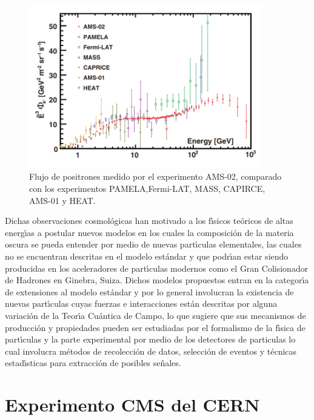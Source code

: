 \begin{figure}
\begin{center}
 \includegraphics[width=4.0in]{AMS_positronflux.png}
  \caption{Flujo de positrones medido por el experimento AMS-02, comparado con los experimentos PAMELA,Fermi-LAT, MASS, CAPIRCE, AMS-01 y HEAT.}
 \label{fig:AMS_positron}
 \end{center}
\end{figure}

Dichas observaciones cosmol\'ogicas han motivado a los f\'{\i}sicos te\'oricos de altas energ\'{\i}as a postular nuevos modelos en los cuales la composici\'on de la materia oscura se pueda entender por medio de nuevas part\'{\i}culas elementales, las cuales no se encuentran descritas en el modelo est\'andar y que podr\'{\i}an estar siendo producidas en los aceleradores de part\'{\i}culas modernos como el Gran Colisionador de Hadrones en Ginebra, Suiza.  Dichos modelos propuestos entran en la categor\'{\i}a de extensiones al modelo est\'andar y por lo general involucran la existencia de nuevas part\'{\i}culas cuyas fuerzas e interacciones est\'an descritas por alguna variaci\'on de la Teor\'{\i}a Cu\'antica de Campo, lo que sugiere que sus mecanismos de producci\'on y propiedades pueden ser estudiadas por el formalismo de la f\'{\i}sica de part\'{\i}culas y la parte experimental por medio de los detectores de particulas lo cual involucra m\'etodos de recolecci\'on de datos, selecci\'on de eventos y t\'ecnicas estad\'{\i}sticas para extracci\'on de posibles se\~nales.

\section{Experimento CMS del CERN}

